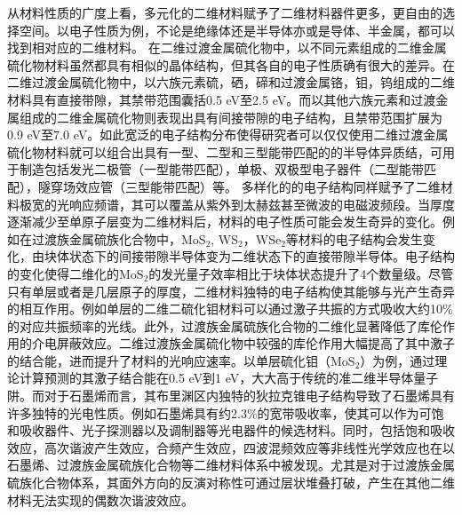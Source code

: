     从材料性质的广度上看，多元化的二维材料赋予了二维材料器件更多，更自由的选择空间。以电子性质为例，不论是绝缘体还是半导体亦或是导体、半金属，都可以找到相对应的二维材料。
    在二维过渡金属硫化物中，以不同元素组成的二维金属硫化物材料虽然都具有相似的晶体结构，但其各自的电子性质确有很大的差异。在二维过渡金属硫化物中，以六族元素硫，硒，碲和过渡金属铬，钼，钨组成的二维材料具有直接带隙，其禁带范围囊括0.5 eV至2.5 eV。而以其他六族元素和过渡金属组成的二维金属硫化物则表现出具有间接带隙的电子结构，且禁带范围扩展为0.9 eV至7.0 eV。如此宽泛的电子结构分布使得研究者可以仅仅使用二维过渡金属硫化物材料就可以组合出具有一型、二型和三型能带匹配的的半导体异质结，可用于制造包括发光二极管（一型能带匹配），单极、双极型电子器件（二型能带匹配），隧穿场效应管（三型能带匹配）等。
    多样化的的电子结构同样赋予了二维材料极宽的光响应频谱，其可以覆盖从紫外到太赫兹甚至微波的电磁波频段。当厚度逐渐减少至单原子层变为二维材料后，材料的电子性质可能会发生奇异的变化。例如在过渡族金属硫族化合物中，MoS$_2$, WS$_2$，WSe$_2$等材料的电子结构会发生变化，由块体状态下的间接带隙半导体变为二维状态下的直接带隙半导体。电子结构的变化使得二维化的MoS$_2$的发光量子效率相比于块体状态提升了4个数量级。尽管只有单层或者是几层原子的厚度，二维材料独特的电子结构使其能够与光产生奇异的相互作用。例如单层的二维二硫化钼材料可以通过激子共振的方式吸收大约10\%的对应共振频率的光线。此外，过渡族金属硫族化合物的二维化显著降低了库伦作用的介电屏蔽效应。二维过渡族金属硫化物中较强的库伦作用大幅提高了其中激子的结合能，进而提升了材料的光响应速率。以单层硫化钼（MoS$_2$）为例，通过理论计算预测的其激子结合能在0.5 eV到1 eV，大大高于传统的准二维半导体量子阱。而对于石墨烯而言，其布里渊区内独特的狄拉克锥电子结构导致了石墨烯具有许多独特的光电性质。例如石墨烯具有约2.3\%的宽带吸收率，使其可以作为可饱和吸收器件、光子探测器以及调制器等光电器件的候选材料。同时，包括饱和吸收效应，高次谐波产生效应，合频产生效应，四波混频效应等非线性光学效应也在以石墨烯、过渡族金属硫族化合物等二维材料体系中被发现。尤其是对于过渡族金属硫族化合物体系，其面外方向的反演对称性可通过层状堆叠打破，产生在其他二维材料无法实现的偶数次谐波效应。%

